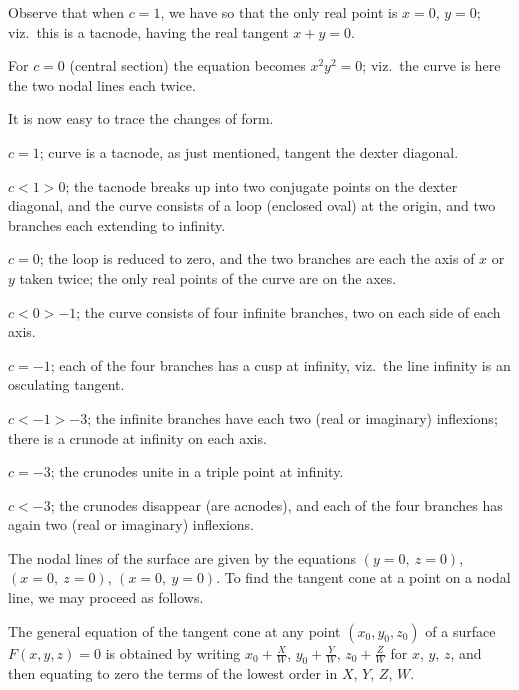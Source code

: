 \documentclass[11pt,a4paper]{book}
\begin{document}
\newpage
\setcounter{page}{8}

Observe that when $c = 1$, we have so that the only real point is $x = 0$, $y = 0$; viz.\ this is a tacnode, having the real tangent $x + y = 0$.

For $c = 0$ (central section) the equation becomes $x^2y^2 = 0$; viz.\ the curve is here the two nodal lines each twice.

It is now easy to trace the changes of form.

\smallskip

$c = 1$; curve is a tacnode, as just mentioned, tangent the dexter diagonal.

\smallskip

$c < 1 > 0$; the tacnode breaks up into two conjugate points on the dexter diagonal, and the curve consists of a loop (enclosed oval) at the origin, and two branches each extending to infinity.

\smallskip

$c = 0$; the loop is reduced to zero, and the two branches are each the axis of $x$ or $y$ taken twice; the only real points of the curve are on the axes.

\smallskip

$c < 0 > -1$; the curve consists of four infinite branches, two on each side of each axis.

\smallskip

$c = -1$; each of the four branches has a cusp at infinity, viz.\ the line infinity is an osculating tangent.

\smallskip

$c < -1 > -3$; the infinite branches have each two (real or imaginary) inflexions; there is a crunode at infinity on each axis.

\smallskip

$c = -3$; the crunodes unite in a triple point at infinity.

\smallskip

$c < -3$; the crunodes disappear (are acnodes), and each of the four branches has again two (real or imaginary) inflexions.

\newpage
\setcounter{page}{9}

The nodal lines of the surface are given by the equations $(y = 0,\ z = 0)$, $(x = 0,\ z = 0)$, $(x = 0,\ y = 0)$. To find the tangent cone at a point on a nodal line, we may proceed as follows.

The general equation of the tangent cone at any point $(x_0, y_0, z_0)$ of a surface $F(x, y, z) = 0$ is obtained by writing $x_0 + \tfrac{X}{W}$, $y_0 + \tfrac{Y}{W}$, $z_0 + \tfrac{Z}{W}$ for $x$, $y$, $z$, and then equating to zero the terms of the lowest order in $X$, $Y$, $Z$, $W$.
\end{document}
